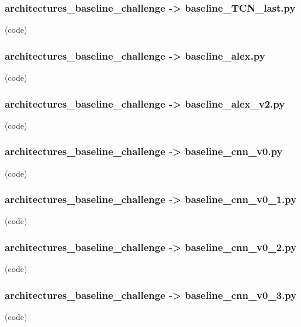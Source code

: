 \begin{myparindent}{0pt}
\noindent\subsubsection[baseline\_TCN\_last.py]{architectures\_baseline\_challenge -> baseline\_TCN\_last.py} (code)

\noindent\subsubsection[baseline\_alex.py]{architectures\_baseline\_challenge -> baseline\_alex.py} (code)

\noindent\subsubsection[baseline\_alex\_v2.py]{architectures\_baseline\_challenge -> baseline\_alex\_v2.py} (code)

\noindent\subsubsection[baseline\_cnn\_v0.py]{architectures\_baseline\_challenge -> baseline\_cnn\_v0.py} (code)

\noindent\subsubsection[baseline\_cnn\_v0\_1.py]{architectures\_baseline\_challenge -> baseline\_cnn\_v0\_1.py} (code)

\noindent\subsubsection[baseline\_cnn\_v0\_2.py]{architectures\_baseline\_challenge -> baseline\_cnn\_v0\_2.py} (code)

\noindent\subsubsection[baseline\_cnn\_v0\_3.py]{architectures\_baseline\_challenge -> baseline\_cnn\_v0\_3.py} (code)

\end{myparindent}
